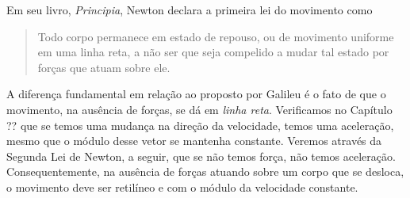 Em seu livro, \emph{Principia}, Newton declara a primeira lei do movimento como
\begin{quote}
  Todo corpo permanece em estado de repouso, ou de movimento uniforme em uma linha reta, a não ser que seja compelido a mudar tal estado por forças que atuam sobre ele.
\end{quote}
%
A diferença fundamental em relação ao proposto por Galileu é o fato de que o movimento, na ausência de forças, se dá em \emph{linha reta}. Verificamos no Capítulo ?? que se temos uma mudança na direção da velocidade, temos uma aceleração, mesmo que o módulo desse vetor se mantenha constante. Veremos através da Segunda Lei de Newton, a seguir, que se não temos força, não temos aceleração. Consequentemente, na ausência de forças atuando sobre um corpo que se desloca, o movimento deve ser retilíneo e com o módulo da velocidade constante.


